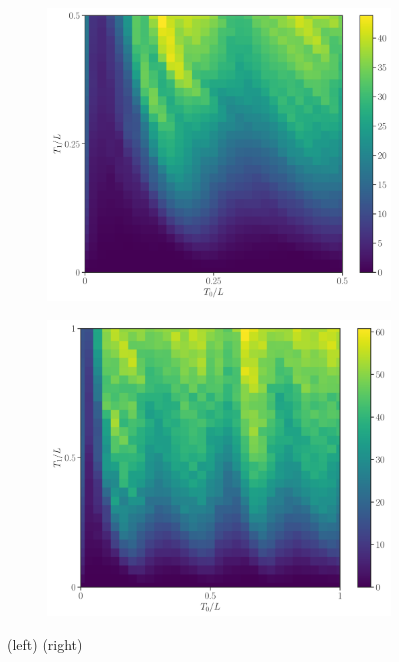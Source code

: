 \documentclass[11pt, a4paper]{article}
\theoremstyle{definition} %
\begin{document}
\begin{figure}[h]
\centering
\begin{subfigure}[t]{0.49\textwidth}
	\centering
	\includegraphics[width =\textwidth]{PhaseDiagram2D}
\end{subfigure}
\begin{subfigure}[t]{0.49\textwidth}
	\centering
	\includegraphics[width =\textwidth]{PhaseDiagram2D-2}
\end{subfigure}
\caption{(left) (right)}
\end{figure}
\end{document}

